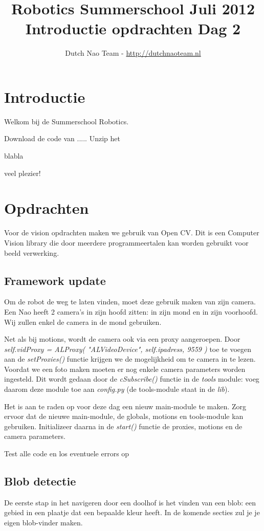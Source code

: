 \documentclass[a4paper]{article}
\title{\textbf{Robotics Summerschool Juli 2012} \\ Introductie opdrachten Dag 2}
\author{Dutch Nao Team - \url{http://dutchnaoteam.nl}}
\date{}
\begin{document}
\maketitle

\section{Introductie}
Welkom bij de Summerschool Robotics.

Download de code van .....
Unzip het 

blabla

veel plezier!


\tableofcontents

\newpage


\section{Opdrachten}
Voor de vision opdrachten maken we gebruik van Open CV. Dit is een Computer Vision library die door meerdere programmeertalen kan worden gebruikt voor beeld verwerking.

\subsection{Framework update}
Om de robot de weg te laten vinden, moet deze gebruik maken van zijn camera. Een Nao heeft 2 camera's in zijn hoofd zitten: in zijn mond en in zijn voorhoofd. Wij zullen enkel de camera in de mond gebruiken.

Net als bij motions, wordt de camera ook via een proxy aangeroepen. Door \textit{self.vidProxy = ALProxy( "ALVideoDevice", self.ipadress, 9559 )} toe te voegen aan de \textit{setProxies()} functie krijgen we de mogelijkheid om te camera in te lezen. Voordat we een foto maken moeten er nog enkele camera parameters worden ingesteld. Dit wordt gedaan door de \textit{cSubscribe()} functie in de \textit{tools} module: voeg daarom deze module toe aan \textit{config.py} (de tools-module staat in de \textit{lib}).

Het is aan te raden op voor deze dag een nieuw main-module te maken. Zorg ervoor dat de nieuwe main-module, de globals, motions en tools-module kan gebruiken. Initializeer daarna in de \textit{start()} functie de proxies, motions en de camera parameters.

Test alle code en los eventuele errors op

\subsection{Blob detectie}
De eerste stap in het navigeren door een doolhof is het vinden van een blob: een gebied in een plaatje dat een bepaalde kleur heeft. In de komende secties zul je je eigen blob-vinder maken.
\end{document}

